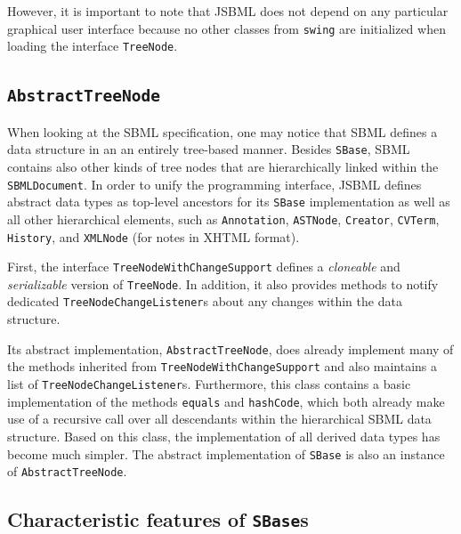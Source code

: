 However, it is important to note that JSBML does not depend on any particular
graphical user interface because no other classes from \texttt{swing} are
initialized when loading the interface
\texttt{TreeNode}.

\subsection{\texttt{AbstractTreeNode}}%

When looking at the SBML specification, one may notice that SBML defines a data
structure in an an entirely tree-based manner. Besides
\texttt{SBase}, SBML contains also other kinds of
tree nodes that are hierarchically linked within the \texttt{SBMLDocument}. 
In order to unify the programming interface, JSBML defines abstract data types
as top-level ancestors for its \texttt{SBase} implementation as well as all
other hierarchical elements, such as \texttt{Annotation},
\texttt{ASTNode},
\texttt{Creator},
\texttt{CVTerm},
\texttt{History}, and
\texttt{XMLNode} (for notes in
XHTML format).

First, the interface \texttt{TreeNodeWithChangeSupport}%
defines a \emph{cloneable} and \emph{serializable} version of
\texttt{TreeNode}. In addition, it also provides methods to notify dedicated
\texttt{TreeNodeChangeListener}s%
about any changes within the data structure.

Its abstract implementation, \texttt{AbstractTreeNode}, does already implement
many of the methods inherited from \texttt{TreeNodeWithChangeSupport} and also
maintains a list of \texttt{TreeNodeChangeListener}s. Furthermore, this class
contains a basic implementation of the methods \texttt{equals} and
\texttt{hashCode}, which both already make use of a recursive call over all
descendants within the hierarchical SBML data structure. Based on this class,
the implementation of all derived data types has become much simpler. The
abstract implementation of \texttt{SBase} is also an instance of
\texttt{AbstractTreeNode}.


\subsection{Characteristic features of \texttt{SBase}s}

